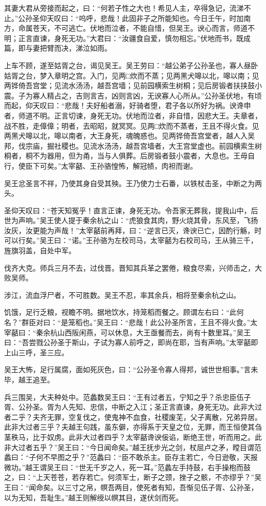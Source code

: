 \documentclass[12pt,UTF8]{ctexbook}
\begin{document}
其妻大君从旁接而起之，曰：“何若子性之大也！希见人主，卒得急记，流涕不止。”公孙圣仰天叹曰：“呜呼，悲哉！此固非子之所能知也。今日壬午，时加南方，命属苍天，不可逃亡。伏地而泣者，不能自惜，但吴王。谀心而言，师道不明；正言直谏，身死无功。”大君曰：“汝疆食自爱，慎勿相忘。”伏地而书，既成篇，即与妻把臂而决，涕泣如雨。

上车不顾，遂至姑胥之台，谒见吴王。吴王劳曰：“越公弟子公孙圣也，寡人昼卧姑胥之台，梦入章明之宫。入门，见两□炊而不蒸；见两黑犬嗥以北，嗥以南；见两铧倚吾宫堂；见流水汤汤，越吾宫墙；见前园横索生树桐；见后房锻者扶挟鼓小震。子为寡人精占之，吉则言吉，凶则言凶，无谀寡人心所从。”公孙圣伏地，有顷而起，仰天叹曰：“悲哉！夫好船者溺，好骑者堕，君子各以所好为祸。谀谗申者，师道不明。正言切谏，身死无功。伏地而泣者，非自惜，因悲大王。夫章者，战不胜，走傽傽；明者，去昭昭，就冥冥。见两□炊而不蒸者，王且不得火食。见两黑犬嗥以北，嗥以南者，大王身死，魂魄惑也。见两铧倚吾宫堂者，越人入吴邦，伐宗庙，掘社稷也。见流水汤汤，越吾宫墙者，大王宫堂虚也。前园横索生树桐者，桐不为器用，但为甬，当与人俱葬。后房锻者鼓小震者，大息也。王毋自行，使臣下可矣。”太宰嚭、王孙骆惶怖，解冠帻，肉袒而谢。

吴王忿圣言不祥，乃使其身自受其殃。王乃使力士石番，以铁杖击圣，中断之为两头。

圣仰天叹曰：“苍天知冤乎！直言正谏，身死无功。令吾家无葬我，提我山中，后世为声响。”吴王使人提于秦余杭之山：“虎狼食其肉，野火烧其骨，东风至，飞扬汝灰，汝更能为声哉！”太宰嚭前再拜，曰：“逆言已灭，谗谀已亡，因酌行觞，时可以行矣。”吴王曰：“诺。”王孙骆为左校司马，太宰嚭为右校司马，王从骑三千，旌旗羽盖，自处中军。

伐齐大克。师兵三月不去，过伐晋。晋知其兵革之罢倦，粮食尽索，兴师击之，大败吴师。

涉江，流血浮尸者，不可胜数。吴王不忍，率其余兵，相将至秦余杭之山。

饥饿，足行乏粮，视瞻不明。据地饮水，持笼稻而餐之。顾谓左右曰：“此何名？”群臣对曰：“是笼稻也。”吴王曰：“悲哉！此公孙圣所言，王且不得火食。”太宰嚭曰：“秦余杭山西阪闲燕，可以休息，大王亟餐而去，尚有十数里耳。”吴王曰：“吾尝戮公孙圣于斯山，子试为寡人前呼之，即尚在耶，当有声响。”太宰嚭即上山三呼，圣三应。

吴王大怖，足行属腐，面如死灰色，曰：“公孙圣令寡人得邦，诚世世相事。”言未毕，越王追至。

兵三围吴，大夫种处中。范蠡数吴王曰：“王有过者五，宁知之乎？杀忠臣伍子胥、公孙圣。胥为人先知、忠信，中断之入江；圣正言直谏，身死无功。此非大过者二乎？夫齐无罪，空复伐之，使鬼神不血食，社稷废芜，父子离散，兄弟异居。此非大过者三乎？夫越王句践，虽东僻，亦得系于天皇之位，无罪，而王恒使其刍茎秩马，比于奴虏。此非大过者四乎？太宰嚭谗谀佞谄，断绝王世，听而用之。此非大过者五乎？”吴王曰：“今日闻命矣。”越王抚步光之剑，杖屈卢之矛，瞠目谓范蠡曰：“子何不早图之乎？”范蠡曰：“臣不敢杀主。臣存主若亡，今日逊敬，天报微功。”越王谓吴王曰：“世无千岁之人，死一耳。”范蠡左手持鼓，右手操枹而鼓之，曰：“上天苍苍，若存若亡。何须军士，断子之颈，挫子之骸，不亦缪乎？”吴王曰：“闻命矣。以三寸之帛，幎吾两目，使死者有知，吾惭见伍子胥、公孙圣，以为无知，吾耻生。”越王则解绶以幎其目，遂伏剑而死。
\end{document}
